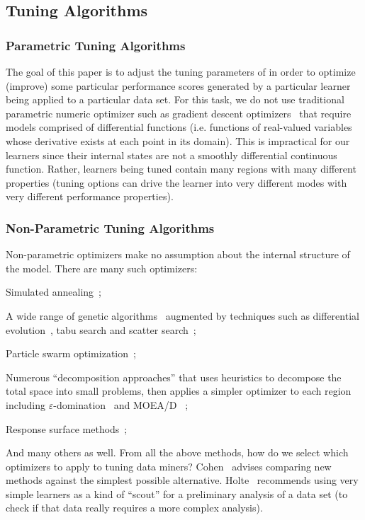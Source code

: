 \subsection{Tuning Algorithms}


 \subsubsection{Parametric Tuning Algorithms}
The  goal of this paper is to adjust the tuning parameters of 
in order to   optimize (improve) some particular performance scores
generated by a particular learner being applied to  a particular data set.
For this task, we do not use traditional parametric numeric optimizer  
such as  gradient descent optimizers~\cite{saltelli00} that require models comprised of
differential functions (i.e. functions of real-valued variables whose derivative exists at each point in its domain).
This is impractical  for  our learners since their internal states are   not a smoothly differential continuous function.
Rather, learners being tuned  contain many regions with many different properties (tuning options can
drive the learner into very different modes with very different performance properties).


 \subsubsection{Non-Parametric Tuning Algorithms}
 
Non-parametric  optimizers   make no assumption
about the internal structure of the model.
There are many such optimizers:
\bi
\item
Simulated annealing~\cite{fea02a,me07f};
\item
A wide range of genetic algorithms~\cite{goldberg79} augmented by
techniques such as differential evolution~\cite{storn1997differential}, tabu search and scatter search~\cite{Glover1986563,Beausoleil2006426,Molina05sspmo:a,4455350};
\item
Particle swarm optimization~\cite{pan08}; 
\item 
Numerous ``decomposition approaches'' that uses
    heuristics to decompose the total space into   small problems,   then applies a
    simpler optimizer to each region including \mbox{$\varepsilon$-domination}~\cite{deb05} and MOEA/D ~\cite{zhang07};
    \item 
    Response surface methods~\cite{krall15,Zuluaga:13};
    \item
    And many others as well.
    \ei
From all the above methods, how do we select which optimizers to apply to tuning data miners?
Cohen~\cite{cohen95} advises comparing new 
 methods against the simplest possible alternative. 
Holte~\cite{holte93} recommends using very simple  learners
 as a
kind of ``scout'' for a  preliminary analysis of a data
set (to check if that data really requires a more
complex analysis).

